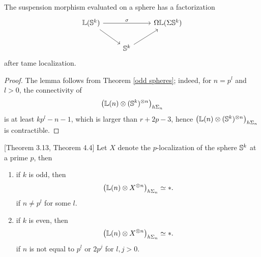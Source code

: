  \begin{lemma}
 	The suspension morphism evaluated on a sphere has a factorization
\[
\begin{tikzcd}
	 \BL(\BS^{k}) &   &  \Omega \BL (\Sigma \BS^{k})\\
	& \BS^{k}  &
	\arrow[from=1-1, to = 1-3, "\sigma"]
	\arrow[from=1-1 , to =2-2]
	\arrow[from=2-2, to=1-3]
\end{tikzcd}
\]
after tame localization.
\end{lemma}
\begin{proof}
	The lemma follows from Theorem \ref{odd spheres}; indeed, for $n=p^l$ and $l>0$, the connectivity of
	\[
	\big(
	{\mathbb{L}}(n)\otimes ({\mathbb{S}}^{k})^{\otimes n}
	\big)_{h\Sigma_n}
	\]
	is at least $kp^l-n-1$, which is larger than $r+2p-3$, hence 
	$\big(
	{\mathbb{L}}(n)\otimes ({\mathbb{S}}^{k})^{\otimes n}
	\big)_{h\Sigma_n}$ is contractible.
	\end{proof}
 \begin{theorem}
 	\cite{Arone-Mahowald}[Theorem 3.13, Theorem 4.4]
 	\label{odd spheres}
 	Let $X$ denote the $p$-localization of the sphere ${\mathbb{S}}^k$ at a prime $p$, then
 	\begin{enumerate}
 		\item if $k$ is odd, then 
 			$$
 			\big({\mathbb{L}}(n)\otimes X^{\otimes n}
 			\big)_{h\Sigma_n}
 			\simeq *.
 			$$
 			if $n\neq p^l$ for some $l$.
 		\item if $k$ is even, then 
 			$$
 			\big({\mathbb{L}}(n)\otimes X^{\otimes n}
 			\big)_{h\Sigma_n}
 			\simeq *.
 			$$
 			if $n$ is not equal to $p^l$ or $2p^j$ for $l, j>0$.
 	\end{enumerate} 	
 \end{theorem}
 
%






